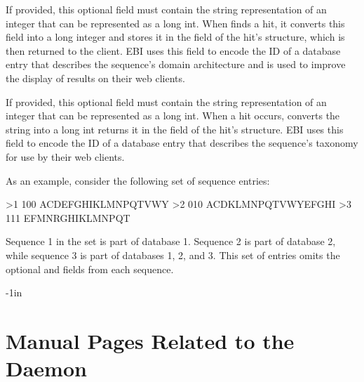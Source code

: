 \documentclass[notoc,justified]{tufte-book}    %
\begin{document}
{\begin{sreitems}{}
\item [\monob{domain\_architecture}] If provided, this optional field must contain the string representation of an integer that can be represented as a long int.  When  finds a hit, it converts this field into a long integer and stores it in the  field of the hit's  structure, which is then returned to the client.  EBI uses this field to encode the ID of a database entry that describes the sequence's domain architecture and is used to improve the display of results on their web clients.   

\item [\monob{taxonomy\_id}] If provided, this optional field must contain the string representation of an integer that can be represented as a long int.  When a hit occurs,  converts the string into a long int returns it in the  field of the hit's  structure.  EBI uses this field to encode the ID of a database entry that describes the sequence's taxonomy for use by their web clients.

\end{sreitems}

As an example, consider the following set of sequence entries:

\begin{sreoutput}
>1 100
ACDEFGHIKLMNPQTVWY
>2 010
ACDKLMNPQTVWYEFGHI
>3 111
EFMNRGHIKLMNPQT
\end{sreoutput}

Sequence 1 in the set is part of database 1.  Sequence 2 is part of database 2, while sequence 3 is part of databases 1, 2, and 3.  This set of entries omits the optional  and  fields from each sequence.




\begin{adjustwidth}{}{-1in}   
\chapter{Manual Pages Related to the Daemon}

\end{adjustwidth}

}
\end{document}
